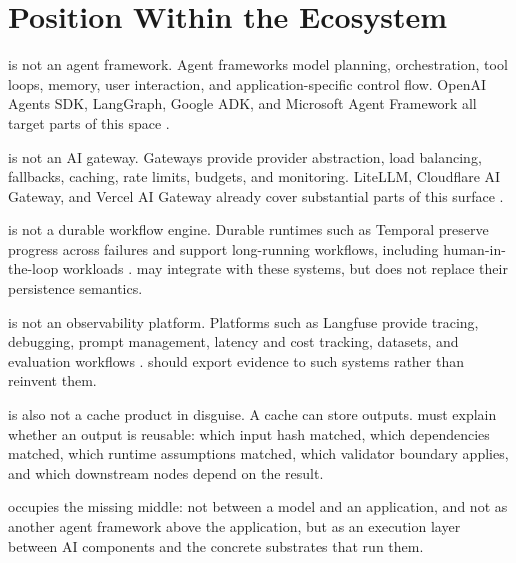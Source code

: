 \section{Position Within the Ecosystem}

\migaki{} is not an agent framework. Agent frameworks model planning, orchestration, tool loops, memory, user interaction, and application-specific control flow. OpenAI Agents SDK, LangGraph, Google ADK, and Microsoft Agent Framework all target parts of this space \citep{openai_agents_js,langgraph_overview,google_adk,microsoft_agent_framework}.

\migaki{} is not an AI gateway. Gateways provide provider abstraction, load balancing, fallbacks, caching, rate limits, budgets, and monitoring. LiteLLM, Cloudflare AI Gateway, and Vercel AI Gateway already cover substantial parts of this surface \citep{litellm_routing,cloudflare_ai_gateway,vercel_ai_gateway_observability,vercel_fallbacks}.

\migaki{} is not a durable workflow engine. Durable runtimes such as Temporal preserve progress across failures and support long-running workflows, including human-in-the-loop workloads \citep{temporal_agents}. \migaki{} may integrate with these systems, but does not replace their persistence semantics.

\migaki{} is not an observability platform. Platforms such as Langfuse provide tracing, debugging, prompt management, latency and cost tracking, datasets, and evaluation workflows \citep{langfuse_docs}. \migaki{} should export evidence to such systems rather than reinvent them.

\migaki{} is also not a cache product in disguise. A cache can store outputs. \migaki{} must explain whether an output is reusable: which input hash matched, which dependencies matched, which runtime assumptions matched, which validator boundary applies, and which downstream nodes depend on the result.

\migaki{} occupies the missing middle: not between a model and an application, and not as another agent framework above the application, but as an execution layer between AI components and the concrete substrates that run them.

\begin{center}
\end{center}

